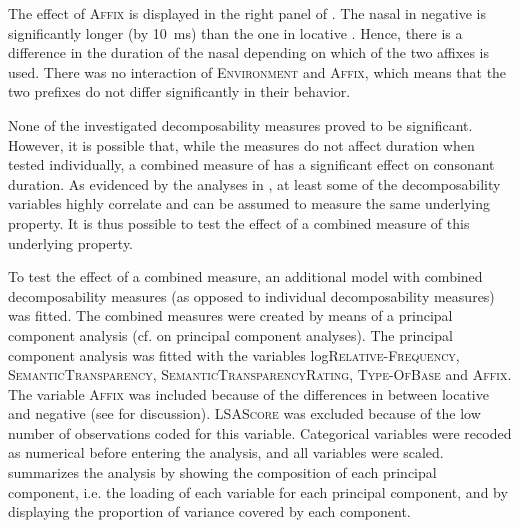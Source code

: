 The effect of \textsc{Affix} is displayed  in the right panel of . The nasal in negative  is significantly longer (by 10~ms) than the one in locative . Hence, there is a difference in the duration of the nasal depending on which of the two affixes is used. There was no interaction of \textsc{Environment} and \textsc{Affix}, which means that the two prefixes do not differ significantly in their  behavior.


None of the investigated decomposability measures proved to be significant. However, it is possible that, while the measures do not affect duration when tested individually, a combined measure of  has a significant effect on consonant duration. As evidenced by the  analyses in , at least some of the decomposability variables highly correlate and can be assumed to measure the same underlying property. It is thus possible to test the effect of a combined measure of this underlying property. 

To test the effect of a combined  measure, an additional model with combined decomposability measures (as opposed to individual decomposability measures) was fitted. The combined measures were created by means of a principal component analysis (cf.  on principal component analyses). 
The principal component analysis was fitted with the variables log\textsc{Relative-Frequency}, \textsc{SemanticTransparency}, \textsc{SemanticTransparencyRating}, \textsc{Type-\linebreak OfBase} and \textsc{Affix}. The variable \textsc{Affix} was included because of the differences in  between locative and negative  (see  for discussion). \textsc{LSAScore} was excluded because of the low number of observations coded for this variable. Categorical variables were recoded as numerical before entering the analysis, and all variables were scaled.
 summarizes the analysis by showing the composition of each principal component, i.e. the loading of each variable for each principal component, and by displaying the proportion of variance covered by each component. 


